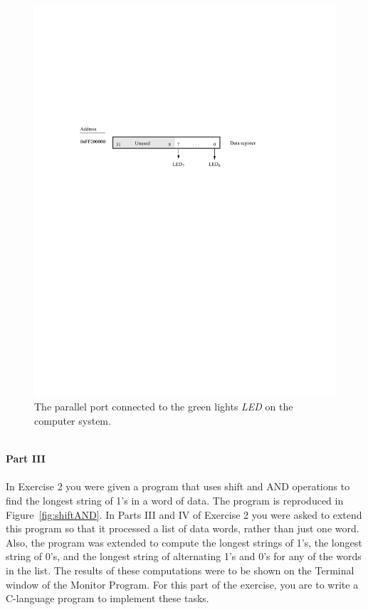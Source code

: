\documentclass[epsfig,10pt,fullpage]{article}
\begin{document}
\begin{figure}[H]
	\begin{center}
	\includegraphics[scale=1]{figures/figureLED.pdf}
	\end{center}
	\caption{The parallel port connected to the green lights {\it LED} on the computer system.}
\label{fig:LED}
\end{figure}

~\\
\noindent
{\bf Part III}
~\\
~\\
\noindent
In Exercise 2 you were given a program that uses shift and AND operations to find the
longest string of 1's in a word of data. The program is reproduced in
Figure~\ref{fig:shiftAND}.  In Parts III and IV of Exercise 2 you were asked to extend
this program so that it processed a list of data words, rather than just one word. Also,
the program was extended to compute the longest
strings of 1's, the longest string of 0's, and the longest string of alternating 1's and 0's
for any of the words in the list. The results of these computations were to be shown 
on the Terminal window of the Monitor Program. For this part of the exercise, you are 
to write a C-language program to implement these tasks.
\end{document}
